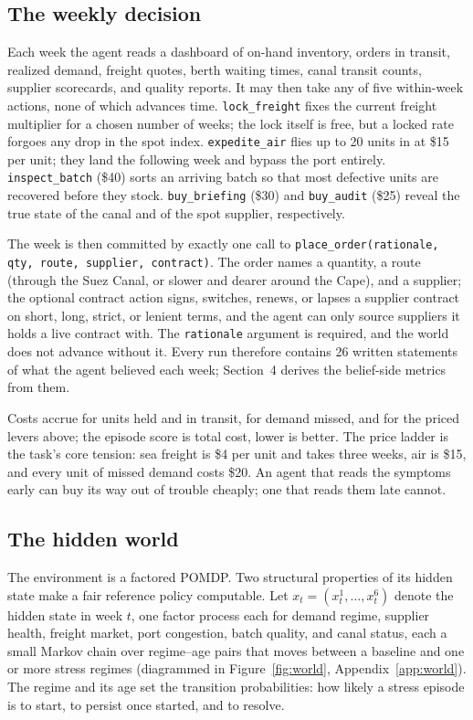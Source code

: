 \documentclass{article}
\begin{document}
\subsection{The weekly decision}

Each week the agent reads a dashboard of on-hand inventory, orders in
transit, realized demand, freight quotes, berth waiting times, canal
transit counts, supplier scorecards, and quality reports. It may then take
any of five within-week actions, none of which advances time.
\texttt{lock\_freight} fixes the current freight multiplier for a chosen
number of weeks; the lock itself is free, but a locked rate forgoes any
drop in the spot index. \texttt{expedite\_air} flies up to 20 units in at
\$15 per unit; they land the following week and bypass the port entirely.
\texttt{inspect\_batch} (\$40) sorts an arriving batch so that most
defective units are recovered before they stock. \texttt{buy\_briefing}
(\$30) and \texttt{buy\_audit} (\$25) reveal the true state of the canal
and of the spot supplier, respectively.

The week is then committed by exactly one call to
\texttt{place\_order(rationale, qty, route, supplier, contract)}. The
order names a quantity, a route (through the Suez Canal, or slower and
dearer around the Cape), and a supplier; the optional contract action
signs, switches, renews, or lapses a supplier contract on short, long,
strict, or lenient terms, and the agent can only source suppliers it holds
a live contract with. The \texttt{rationale} argument is required, and the
world does not advance without it. Every run therefore contains 26 written
statements of what the agent believed each week; Section~4 derives the
belief-side metrics from them.

Costs accrue for units held and in transit, for demand missed, and for the
priced levers above; the episode score is total cost, lower is better. The
price ladder is the task's core tension: sea freight is \$4 per unit and
takes three weeks, air is \$15, and every unit of missed demand costs
\$20. An agent that reads the symptoms early can buy its way out of
trouble cheaply; one that reads them late cannot.

\subsection{The hidden world}

The environment is a factored POMDP. Two structural properties of its
hidden state make a fair reference policy computable. Let $x_t = (x_t^1,
\dots, x_t^6)$ denote the hidden state in week $t$, one factor process
each for demand regime, supplier health, freight market, port congestion,
batch quality, and canal status, each a small Markov chain over
regime--age pairs that moves between a baseline and one or more stress
regimes (diagrammed in Figure~\ref{fig:world},
Appendix~\ref{app:world}). The regime and its age set the
transition probabilities: how likely a stress episode is to start, to
persist once started, and to resolve.
\end{document}
